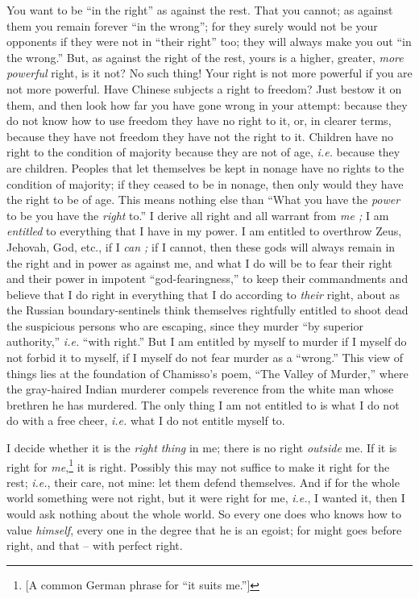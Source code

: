 \documentclass[12pt,a4paper]{book}
\begin{document}
You want to be ``in the right'' as against the rest. That you cannot; as 
against them you remain forever ``in the wrong''; for they surely would not 
be your opponents if they were not in ``their right'' too; they will always 
make you out ``in the wrong.'' But, as against the right of the rest, yours 
is a higher, greater, \textit{more powerful} right, is it not? No such thing! 
Your right is not more powerful if you are not more powerful. Have Chinese 
subjects a right to freedom? Just bestow it on them, and then look how far you 
have gone wrong in your attempt: because they do not know how to use freedom 
they have no right to it, or, in clearer terms, because they have not freedom 
they have not the right to it. Children have no right to the condition of 
majority because they are not of age, \textit{i.e.} because they are children. 
Peoples that let themselves be kept in nonage have no rights to the condition 
of majority; if they ceased to be in nonage, then only would they have the 
right to be of age. This means nothing else than ``What you have the 
\textit{power} to be you have the \textit{right} to.'' I derive all right and 
all warrant from \textit{me ;} I am \textit{entitled} to everything that I 
have in my power. I am entitled to overthrow Zeus, Jehovah, God, etc., if I 
\textit{can ;} if I cannot, then these gods will always remain in the right 
and in power as against me, and what I do will be to fear their right and 
their power in impotent ``god-fearingness,'' to keep their commandments and 
believe that I do right in everything that I do according to \textit{their} 
right, about as the Russian boundary-sentinels think themselves rightfully 
entitled to shoot dead the suspicious persons who are escaping, since they 
murder ``by superior authority,'' \textit{i.e.} ``with right.'' But I am 
entitled by myself to murder if I myself do not forbid it to myself, if I 
myself do not fear murder as a ``wrong.'' This view of things lies at the 
foundation of Chamisso's poem, ``The Valley of Murder,'' where the 
gray-haired Indian murderer compels reverence from the white man whose 
brethren he has murdered. The only thing I am not entitled to is what I do not 
do with a free cheer, \textit{i.e.} what I do not entitle myself to.

I decide whether it is the \textit{right thing} in me; there is no right 
\textit{outside} me. If it is right for \textit{me},\footnote{[A common German 
phrase for ``it suits me.'']} it is right. Possibly this may not suffice to 
make it right for the rest; \textit{i.e.}, their care, not mine: let them 
defend themselves. And if for the whole world something were not right, but it 
were right for me, \textit{i.e.}, I wanted it, then I would ask nothing about 
the whole world. So every one does who knows how to value \textit{himself}, 
every one in the degree that he is an egoist; for might goes before right, and 
that -- with perfect right.
\end{document}
